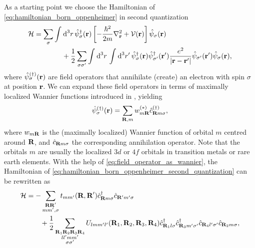 \documentclass[\main/main.tex]{subfiles}
\begin{document}
As a starting point we choose the Hamiltonian of \eqref{eq:hamiltonian_born_oppenheimer} in second quantization
\begin{align}\label{eq:hamiltonian_born_oppenheimer_second_quantization}
\begin{split}
	\mathcal{H}&=\sum_{\sigma}\int_{}^{}\text{d}^3r\,\hat{\psi}^{\dagger}_{\sigma}(\textbf{r})\left [-\frac{\hbar^2}{2m}\nabla^2_{\textbf{r}}+\mathcal{V}(\textbf{r})\right ]\hat{\psi}_{\sigma}(\textbf{r})\\
	 &\qquad\qquad+\frac 12 \sum_{\sigma\sigma'}\int_{}^{}\text{d}^3r\,\int_{}^{}\text{d}^3r'\,\hat{\psi}^{\dagger}_{\sigma}(\textbf{r})\hat{\psi}^{\dagger}_{\sigma'}(\textbf{r}')\frac{e^2}{|\textbf{r}-\textbf{r}'|}\hat{\psi}_{\sigma'}(\textbf{r}')\hat{\psi}_{\sigma}(\textbf{r}),
\end{split}
\end{align}
where $\hat{\psi}^{(\dagger)}_{\sigma}(\textbf{r})$ are field operators that annihilate (create) an electron with spin $\sigma$ at position $\textbf{r}$. We can expand these field operators in terms of maximally localized Wannier functions introduced in , yielding
\begin{align}\label{eq:field_operator_as_wannier}
	\hat{\psi}^{(\dagger)}_{\sigma}(\textbf{r})=\sum_{\textbf{R},m}w^{(*)}_{m\textbf{R}}\hat c^{(\dagger)}_{\textbf{R}m\sigma},
\end{align}
where $w_{m\textbf{R}}$ is the (maximally localized) Wannier function of orbital $m$ centred around $\textbf{R}$, and $\hat c_{\textbf{R}m\sigma}$ the corresponding annihilation operator. Note that the orbitals $m$ are usually the localized $3d$ or $4f$ orbitals in transition metals or rare earth elements. With the help of \eqref{eq:field_operator_as_wannier}, the Hamiltonian of \eqref{eq:hamiltonian_born_oppenheimer_second_quantization} can be rewritten as
\begin{align}\label{eq:general_hubbard_hamiltonian}
\begin{split}
	\mathcal{H}&=-\sum_{\substack{\textbf{R}\textbf{R}'\\ mm',\sigma}}t_{mm'}(\textbf{R},\textbf{R}')\hat c^{\dagger}_{\textbf{R}m\sigma}\hat c_{\textbf{R}'m'\sigma}\\
	&\qquad+\frac 12 \sum_{\substack{\textbf{R}_1\textbf{R}_2\textbf{R}_3\textbf{R}_4\\ ll'mm'\\\sigma\sigma'}}U_{lmm'l'}(\textbf{R}_1,\textbf{R}_2,\textbf{R}_3,\textbf{R}_4) \hat c^{\dagger}_{\textbf{R}_1l\sigma} \hat c^{\dagger}_{\textbf{R}_3 m'\sigma'} \hat c_{\textbf{R}_4l'\sigma'} \hat c_{\textbf{R}_2m\sigma},
\end{split}
\end{align}
\end{document}
